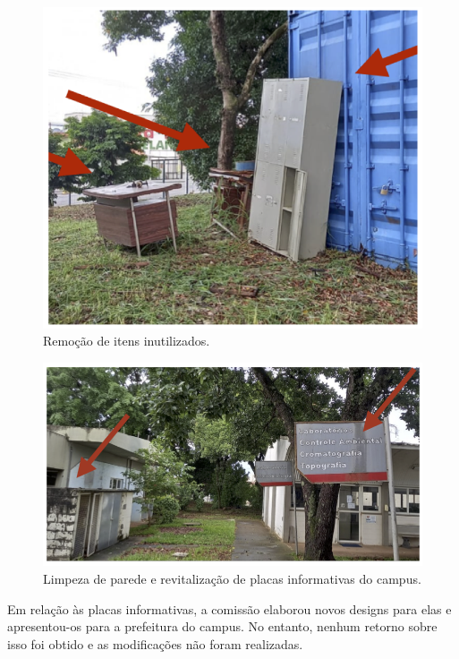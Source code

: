 \documentclass[
  letterpaper,
  DIV=11,
  numbers=noendperiod]{scrreprt}
\begin{document}
\begin{figure}[H]

{\centering \includegraphics[width=0.6\linewidth,height=\textheight,keepaspectratio]{recomendacoes/melhoria-2.png}

}

\caption{Remoção de itens inutilizados.}

\end{figure}%

\begin{figure}[H]

{\centering \includegraphics[width=0.6\linewidth,height=\textheight,keepaspectratio]{recomendacoes/melhoria-3.png}

}

\caption{Limpeza de parede e revitalização de placas informativas do
campus.}

\end{figure}%

Em relação às placas informativas, a comissão elaborou novos designs
para elas e apresentou-os para a prefeitura do campus. No entanto,
nenhum retorno sobre isso foi obtido e as modificações não foram
realizadas.
\end{document}
